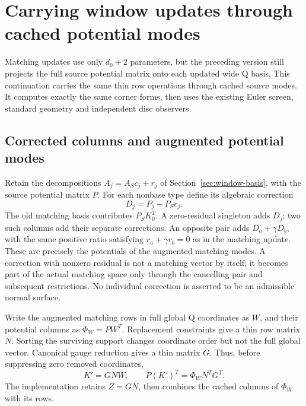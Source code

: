 \section{Carrying window updates through cached potential modes}
\label{sec:window-modes}

Matching updates use only $d_0+2$ parameters, but the preceding version
still projects the full source potential matrix onto each updated wide
Q basis. This continuation carries the same thin row operations through
cached source modes. It computes exactly the same corner forms, then uses
the existing Euler screen, standard geometry and independent disc observers.

\subsection{Corrected columns and augmented potential modes}

Retain the decompositions $A_j=A_Sc_j+r_j$ of
Section~\ref{sec:window-basis}, with the source potential matrix $P$.
For each nonbase type define its algebraic correction
\[
                 D_j=P_j-P_Sc_j.
\]
The old matching basis contributes $P_SK_0^T$. A zero-residual singleton
adds $D_j$; two such columns add their separate corrections. An opposite
pair adds $D_a+\gamma D_b$, with the same positive ratio satisfying
$r_a+\gamma r_b=0$ as in the matching update.
These are precisely the potentials of the augmented matching modes.
A correction with nonzero residual is not a matching vector by itself;
it becomes part of the actual matching space only through the cancelling
pair and subsequent restrictions. No individual correction is asserted
to be an admissible normal surface.

Write the augmented matching rows in full global Q coordinates as $W$,
and their potential columns as $\Phi_W=PW^T$. Replacement constraints give
a thin row matrix $N$. Sorting the surviving support changes coordinate
order but not the full global vector. Canonical gauge reduction gives a
thin matrix $G$. Thus, before suppressing zero removed coordinates,
\[
              K'=GNW,\qquad
              P(K')^T=\Phi_WN^TG^T.
\]
The implementation retains $Z=GN$, then combines the cached columns of
$\Phi_W$ with its rows.

